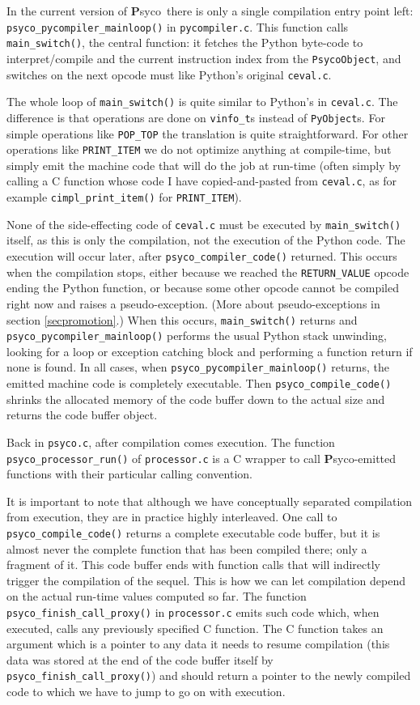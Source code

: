 \documentclass{article}
\def\Psyco{{\bf P}syco}
\def\code#1{\texttt{#1}}
\begin{document}
In the current version of \Psyco\ there is only a single compilation entry point left: \code{psyco_pycompiler_mainloop()} in \code{pycompiler.c}. This function calls \code{main_switch()}, the central function: it fetches the Python byte-code to interpret/compile and the current instruction index from the \code{PsycoObject}, and switches on the next opcode must like Python's original \code{ceval.c}.

The whole loop of \code{main_switch()} is quite similar to Python's in \code{ceval.c}. The difference is that operations are done on \code{vinfo_t}s instead of \code{PyObject}s. For simple operations like \code{POP_TOP} the translation is quite straightforward. For other operations like \code{PRINT_ITEM} we do not optimize anything at compile-time, but simply emit the machine code that will do the job at run-time (often simply by calling a C function whose code I have copied-and-pasted from \code{ceval.c}, as for example \code{cimpl_print_item()} for \code{PRINT_ITEM}).

None of the side-effecting code of \code{ceval.c} must be executed by \code{main_switch()} itself, as this is only the compilation, not the execution of the Python code. The execution will occur later, after \code{psyco_compiler_code()} returned. This occurs when the compilation stops, either because we reached the \code{RETURN_VALUE} opcode ending the Python function, or because some other opcode cannot be compiled right now and raises a pseudo-exception. (More about pseudo-exceptions in section \ref{secpromotion}.) When this occurs, \code{main_switch()} returns and \code{psyco_pycompiler_mainloop()} performs the usual Python stack unwinding, looking for a loop or exception catching block and performing a function return if none is found. In all cases, when \code{psyco_pycompiler_mainloop()} returns, the emitted machine code is completely executable. Then \code{psyco_compile_code()} shrinks the allocated memory of the code buffer down to the actual size and returns the code buffer object.

Back in \code{psyco.c}, after compilation comes execution. The function \code{psyco_processor_run()} of \code{processor.c} is a C wrapper to call \Psyco-emitted functions with their particular calling convention.

It is important to note that although we have conceptually separated compilation from execution, they are in practice highly interleaved. One call to \code{psyco_compile_code()} returns a complete executable code buffer, but it is almost never the complete function that has been compiled there; only a fragment of it. This code buffer ends with function calls that will indirectly trigger the compilation of the sequel. This is how we can let compilation depend on the actual run-time values computed so far. The function \code{psyco_finish_call_proxy()} in \code{processor.c} emits such code which, when executed, calls any previously specified C function. The C function takes an argument which is a pointer to any data it needs to resume compilation (this data was stored at the end of the code buffer itself by \code{psyco_finish_call_proxy()}) and should return a pointer to the newly compiled code to which we have to jump to go on with execution.
\end{document}

